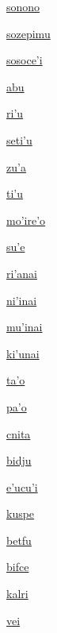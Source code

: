 {\hyperlink{val:sonono}{sonono}}{}{}{}

{\hyperlink{val:sozepimu}{sozepimu}}{}{}{}

{\hyperlink{val:sosocehi}{sosoce'i}}{}{}{}

{\hyperlink{val:abu}{abu}}{}{}{}

{\hyperlink{val:rihu}{ri'u}}{}{}{}

{\hyperlink{val:setihu}{seti'u}}{}{}{}

{\hyperlink{val:zuha}{zu'a}}{}{}{}

{\hyperlink{val:tihu}{ti'u}}{}{}{}

{\hyperlink{val:mohireho}{mo'ire'o}}{}{}{}

{\hyperlink{val:suhe}{su'e}}{}{}{}

{\hyperlink{val:rihanai}{ri'anai}}{}{}{}

{\hyperlink{val:nihinai}{ni'inai}}{}{}{}

{\hyperlink{val:muhinai}{mu'inai}}{}{}{}

{\hyperlink{val:kihunai}{ki'unai}}{}{}{}

{\hyperlink{val:taho}{ta'o}}{}{}{}

{\hyperlink{val:paho}{pa'o}}{}{}{}

{\hyperlink{val:cnita}{cnita}}{}{}{}

{\hyperlink{val:bidju}{bidju}}{}{}{}

{\hyperlink{val:ehucuhi}{e'ucu'i}}{}{}{}

{\hyperlink{val:kuspe}{kuspe}}{}{}{}

{\hyperlink{val:betfu}{betfu}}{}{}{}

{\hyperlink{val:bifce}{bifce}}{}{}{}

{\hyperlink{val:kalri}{kalri}}{}{}{}

{\hyperlink{val:vei}{vei}}{}{}{}

